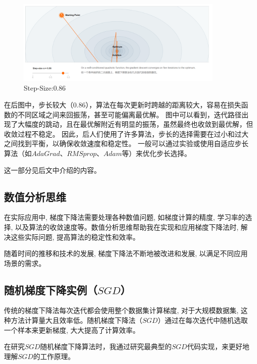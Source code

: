 \documentclass[printMode=false, declarePage=false]{ecnuthesis}
\begin{document}
    \begin{figure} [H]
        \centering
        \includegraphics[width=0.9\textwidth]{Step086.png}
        \caption{Step-Size:0.86}
        \label{fig:gradient-descent}
    \end{figure}

    在后图中，步长较大（$0.86$），算法在每次更新时跨越的距离较大，容易在损失函数的不同区域之间来回振荡，甚至可能偏离最优解。\cite{becker1988improving}
    图中可以看到，迭代路径出现了大幅度的跳动，且在最优解附近有明显的振荡，虽然最终也收敛到最优解，但收敛过程不稳定。
    因此，后人们使用了许多算法，步长的选择需要在过小和过大之间找到平衡，以确保收敛速度和稳定性。
    一般可以通过实验或使用自适应步长算法（如$AdaGrad$、$RMSprop$、$Adam$等）来优化步长选择。

    这一部分见后文中介绍的内容。

    \subsection{数值分析思维}
    在实际应用中, 梯度下降法需要处理各种数值问题, 如梯度计算的精度, 学习率的选择, 以及算法的收敛速度等。数值分析思维帮助我在实现和应用梯度下降法时, 解决这些实际问题, 提高算法的稳定性和效率。

    随着时间的推移和技术的发展, 梯度下降法不断地被改进和发展, 以满足不同应用场景的需求。

    \subsection{随机梯度下降实例（$SGD$）}
    传统的梯度下降法每次迭代都会使用整个数据集计算梯度, 对于大规模数据集, 这种方法计算量大且效率低。随机梯度下降法（$SGD$）通过在每次迭代中随机选取一个样本来更新梯度, 大大提高了计算效率。

    在研究$SGD$随机梯度下降算法时，我通过研究最典型的$SGD$代码实现，来更好地理解$SGD$的工作原理。
\end{document}

